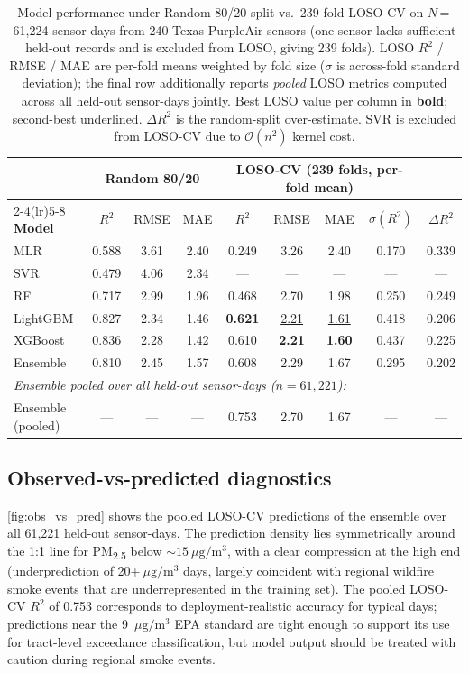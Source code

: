 \documentclass{article}
\begin{document}
\begin{table}[t]
\caption{Model performance under Random 80/20 split vs.\ 239-fold LOSO-CV on $N$\,=\,61{,}224 sensor-days from 240 Texas PurpleAir sensors (one sensor lacks sufficient held-out records and is excluded from LOSO, giving 239 folds). LOSO $R^2$ / RMSE / MAE are per-fold means weighted by fold size ($\sigma$ is across-fold standard deviation); the final row additionally reports \emph{pooled} LOSO metrics computed across all held-out sensor-days jointly. Best LOSO value per column in \textbf{bold}; second-best \underline{underlined}. $\Delta R^2$ is the random-split over-estimate. SVR is excluded from LOSO-CV due to $\mathcal{O}(n^2)$ kernel cost.}
\label{tab:results}
\centering
\small
\begin{tabular}{lcccccccc}
\toprule
& \multicolumn{3}{c}{\textbf{Random 80/20}} & \multicolumn{4}{c}{\textbf{LOSO-CV (239 folds, per-fold mean)}} & \\
\cmidrule(lr){2-4}\cmidrule(lr){5-8}
\textbf{Model} & $R^2$ & RMSE & MAE & $R^2$ & RMSE & MAE & $\sigma(R^2)$ & $\Delta R^2$ \\
\midrule
MLR       & 0.588 & 3.61 & 2.40 & 0.249 & 3.26 & 2.40 & 0.170 & 0.339 \\
SVR       & 0.479 & 4.06 & 2.34 & ---   & ---  & ---  & ---   & ---   \\
RF        & 0.717 & 2.99 & 1.96 & 0.468 & 2.70 & 1.98 & 0.250 & 0.249 \\
LightGBM  & 0.827 & 2.34 & 1.46 & \textbf{0.621} & \underline{2.21} & \underline{1.61} & 0.418 & 0.206 \\
XGBoost   & 0.836 & 2.28 & 1.42 & \underline{0.610} & \textbf{2.21} & \textbf{1.60} & 0.437 & 0.225 \\
Ensemble  & 0.810 & 2.45 & 1.57 & 0.608 & 2.29 & 1.67 & 0.295 & 0.202 \\
\midrule
\multicolumn{9}{l}{\textit{Ensemble pooled over all held-out sensor-days ($n = 61{,}221$):}}\\
Ensemble (pooled) & --- & --- & --- & 0.753 & 2.70 & 1.67 & --- & --- \\
\bottomrule
\end{tabular}
\end{table}

\subsection{Observed-vs-predicted diagnostics}

\autoref{fig:obs_vs_pred} shows the pooled LOSO-CV predictions of the ensemble over all 61{,}221 held-out sensor-days. The prediction density lies symmetrically around the 1:1 line for PM\textsubscript{2.5} below $\sim\!15~\mu\mathrm{g}/\mathrm{m}^3$, with a clear compression at the high end (underprediction of 20+$~\mu\mathrm{g}/\mathrm{m}^3$ days, largely coincident with regional wildfire smoke events that are underrepresented in the training set). The pooled LOSO-CV $R^2$ of 0.753 corresponds to deployment-realistic accuracy for typical days; predictions near the 9~$\mu\mathrm{g}/\mathrm{m}^3$ EPA standard are tight enough to support its use for tract-level exceedance classification, but model output should be treated with caution during regional smoke events.
\end{document}
